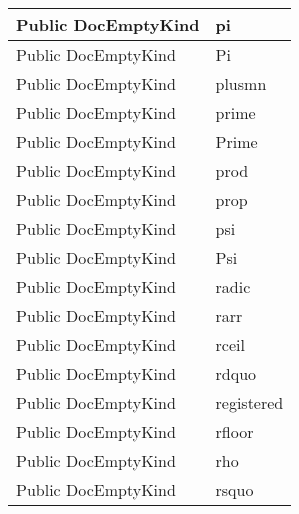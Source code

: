 \documentclass[11pt, oneside, a4paper]{book}
\begin{document}
\begin{center}
\begin{tabular}{| p{3cm} | p{12cm} | }
\hline
 Public  DocEmptyKind &  pi\hypertarget{SoftwareEngineeringTools.{}Documentation.{}DocEmptyKind.{}pi}{}\\
\hline
 Public  DocEmptyKind &  Pi\hypertarget{SoftwareEngineeringTools.{}Documentation.{}DocEmptyKind.{}Pi}{}\\
\hline
 Public  DocEmptyKind &  plusmn\hypertarget{SoftwareEngineeringTools.{}Documentation.{}DocEmptyKind.{}plusmn}{}\\
\hline
 Public  DocEmptyKind &  prime\hypertarget{SoftwareEngineeringTools.{}Documentation.{}DocEmptyKind.{}prime}{}\\
\hline
 Public  DocEmptyKind &  Prime\hypertarget{SoftwareEngineeringTools.{}Documentation.{}DocEmptyKind.{}Prime}{}\\
\hline
 Public  DocEmptyKind &  prod\hypertarget{SoftwareEngineeringTools.{}Documentation.{}DocEmptyKind.{}prod}{}\\
\hline
 Public  DocEmptyKind &  prop\hypertarget{SoftwareEngineeringTools.{}Documentation.{}DocEmptyKind.{}prop}{}\\
\hline
 Public  DocEmptyKind &  psi\hypertarget{SoftwareEngineeringTools.{}Documentation.{}DocEmptyKind.{}psi}{}\\
\hline
 Public  DocEmptyKind &  Psi\hypertarget{SoftwareEngineeringTools.{}Documentation.{}DocEmptyKind.{}Psi}{}\\
\hline
 Public  DocEmptyKind &  radic\hypertarget{SoftwareEngineeringTools.{}Documentation.{}DocEmptyKind.{}radic}{}\\
\hline
 Public  DocEmptyKind &  rarr\hypertarget{SoftwareEngineeringTools.{}Documentation.{}DocEmptyKind.{}rarr}{}\\
\hline
 Public  DocEmptyKind &  rceil\hypertarget{SoftwareEngineeringTools.{}Documentation.{}DocEmptyKind.{}rceil}{}\\
\hline
 Public  DocEmptyKind &  rdquo\hypertarget{SoftwareEngineeringTools.{}Documentation.{}DocEmptyKind.{}rdquo}{}\\
\hline
 Public  DocEmptyKind &  registered\hypertarget{SoftwareEngineeringTools.{}Documentation.{}DocEmptyKind.{}registered}{}\\
\hline
 Public  DocEmptyKind &  rfloor\hypertarget{SoftwareEngineeringTools.{}Documentation.{}DocEmptyKind.{}rfloor}{}\\
\hline
 Public  DocEmptyKind &  rho\hypertarget{SoftwareEngineeringTools.{}Documentation.{}DocEmptyKind.{}rho}{}\\
\hline
 Public  DocEmptyKind &  rsquo\hypertarget{SoftwareEngineeringTools.{}Documentation.{}DocEmptyKind.{}rsquo}{}\\

\end{tabular}
\end{center}
\end{document}
